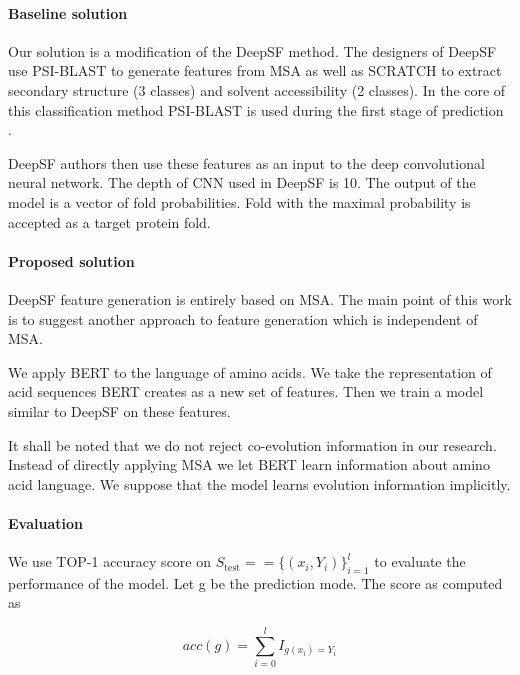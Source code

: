 \documentclass[12pt, twoside]{article}
\begin{document}
\paragraph{Baseline solution}
\noindent
Our solution is a modification of the DeepSF \cite{DeepSF} method. The designers of DeepSF use PSI-BLAST\cite{PSIBLAST} to generate features from MSA  as well as SCRATCH \cite{SCRATCH} to extract secondary structure (3 classes) and solvent accessibility (2 classes).  In the core of this classification method PSI-BLAST is used during the first stage of prediction \cite{SCRATCH}. 

DeepSF authors then use these features as an input to the deep convolutional neural network. The depth of CNN used in DeepSF is 10. The output of the model is a vector of fold probabilities. Fold with the maximal probability is accepted as a target protein fold. 

\paragraph{Proposed solution}
\noindent

DeepSF feature generation is entirely based on MSA. The main point of this work is to suggest another approach to feature generation which is independent of MSA. 

We apply BERT to the language of amino acids. We take the representation of acid sequences BERT creates as a new set of features. Then we train a model similar to DeepSF on these features.

It shall be noted that we do not reject co-evolution information in our research. Instead of directly applying MSA we let BERT learn information about amino acid language. We suppose that the model learns evolution information implicitly.

\paragraph{Evaluation}
\noindent

We use TOP-1 accuracy score on $S_{\text{test}} = = \{ (x_i, Y_i)\}_{i = 1}^l$ to evaluate the performance of the model. Let g be the prediction mode. The score as computed as 

$$acc(g) = \sum_{i = 0}^{l} I_{g(x_i) = Y_i}$$
\end{document}
